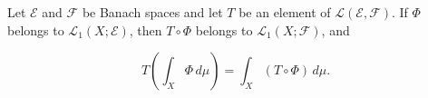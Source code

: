 Let $\mathcal{E}$ and $\mathcal{F}$ be Banach spaces and let $T$ be an element of $\mathcal{L}(\mathcal{E}, \mathcal{F})$. If $\Phi$ belongs to $\mathcal{L}_1(X; \mathcal{E})$, then $T \circ \Phi$ belongs to $\mathcal{L}_1(X; \mathcal{F})$, and

$$T\left( \int_X \Phi \, d\mu \right) = \int_X (T \circ \Phi) \, d\mu.$$
